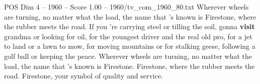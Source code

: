 \begin{textsample}{POS Dim 4 – 1960 – Score 1.00 – 1960/tv\_com\_1960\_80.txt}  \label{ex:f4_pos_019}
Wherever wheels are turning, no matter what the load, the name that 's known is Firestone, where the rubber meets the road.
If you 're carrying steel or tilling the soil, gonna \textbf{visit} grandma or looking for oil, for the youngest driver and the real old pro, for a jet to land or a lawn to mow, for moving mountains or for stalking geese, following a golf ball or keeping the peace.
Wherever wheels are turning, no matter what the load, the name that 's known is Firestone.
Firestone, where the rubber meets the road.
Firestone, your symbol of quality and service.

\end{textsample}
